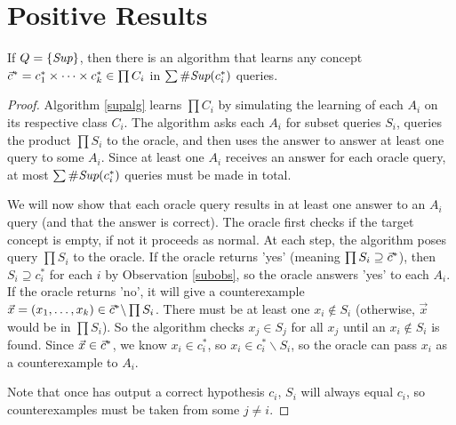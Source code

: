 \documentclass[11pt]{amsart}
\begin{document}
\section{Positive Results}

\begin{proposition}

If $Q = \{ \supQ \}$, then there is an algorithm that learns any concept $\targ = c^*_1 \times \dots \times c^*_k  \in \prod C_i $ in $\sum \supCi{i}(c^*_i)$ queries.  
\end{proposition}
\begin{proof}
Algorithm \ref{supalg} learns $\prod C_i $ by simulating the learning of each $A_i$ on its respective class $C_i$. 
The algorithm asks each $A_i$ for subset queries $S_i$, queries the product $\prod S_i$ to the oracle, and then uses the answer to answer at least one query to some $A_i$. 
Since at least one $A_i$ receives an answer for each oracle query, at most $\sum \supCi{i}(c^*_i)$ queries must be made in total. 

 

We will now show that each oracle query results in at least one answer to an $A_i$ query (and that the answer is correct). 
The oracle first checks if the target concept is empty, if not it proceeds as normal.
At each step, the algorithm poses query $\prod S_i$ to the oracle. 
If the oracle returns 'yes' (meaning $\prod S_i \supseteq \targ$), then  $S_i \supseteq c_i^*$ for each $i$ by Observation \ref{subobs}, so the oracle answers 'yes' to each $A_i$. 
If the oracle returns 'no', it will give a counterexample $\vec{x} = (x_1,\dots,x_k) \in \targ \backslash \prod S_i$. 
There must be at least one $x_i \not\in S_i$ (otherwise, $\vec{x}$ would be in $\prod S_i$). 
So the algorithm checks $x_j \in S_j$ for all $x_j$ until an $x_i \not\in S_i$ is found. 
Since $\vec{x} \in \targ$, we know $x_i \in c_i^*$, so $x_i \in c_i^* \backslash S_i$, so the oracle can pass $x_i$ as a counterexample to $A_i$. 

Note that once has output a correct hypothesis $c_i$, $S_i$ will always equal $c_i$, so counterexamples must be taken from some $j \ne i$. 
\end{proof}
\end{document}

